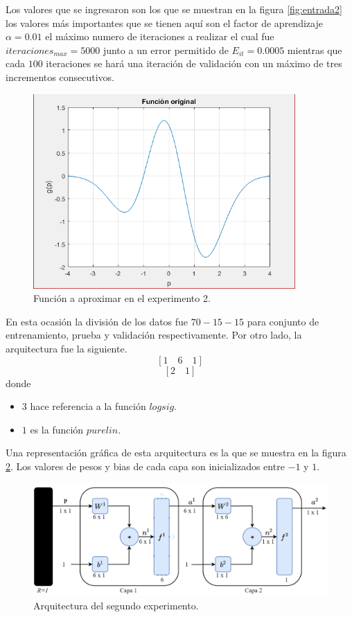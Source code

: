 \documentclass[12pt, titlepage]{article}
\begin{document}
Los valores que se ingresaron son los que se muestran en la figura \ref{fig:entrada2} los valores más importantes que se tienen aquí son el factor de aprendizaje $\alpha=0.01$ el máximo numero de iteraciones a realizar el cual fue $iteraciones_{max} = 5000$ junto a un error permitido de $E_{it} = 0.0005$ mientras que cada $100$ iteraciones se hará una iteración de validación con un máximo de tres incrementos consecutivos.
\begin{figure}[H]
    \begin{center}
        \includegraphics[width=10cm]{2/original.png}
        \caption{Función a aproximar en el experimento 2.}
        \label{fig:original2}
    \end{center}
\end{figure}
En esta ocasión la división de los datos fue $70-15-15$ para conjunto de entrenamiento, prueba y validación respectivamente. Por otro lado, la arquitectura fue la siguiente.
\[ \left[ 1 \quad 6 \quad 1 \right] \]
\[ \left[ 2 \quad 1 \right] \]
donde
\begin{itemize}
    \item $3$ hace referencia a la función $logsig$.
    \item $1$ es la función $purelin$.
\end{itemize}
Una representación gráfica de esta arquitectura es la que se muestra en la figura \ref{fig:arqui2}. Los valores de pesos y bias de cada capa son inicializados entre $-1$ y $1$.
\begin{figure}[H]
    \begin{center}
        \includegraphics[width=14cm]{img/arqui1.png}
        \caption{Arquitectura del segundo experimento.}
        \label{fig:arqui2}
    \end{center}
\end{figure}
\end{document}
